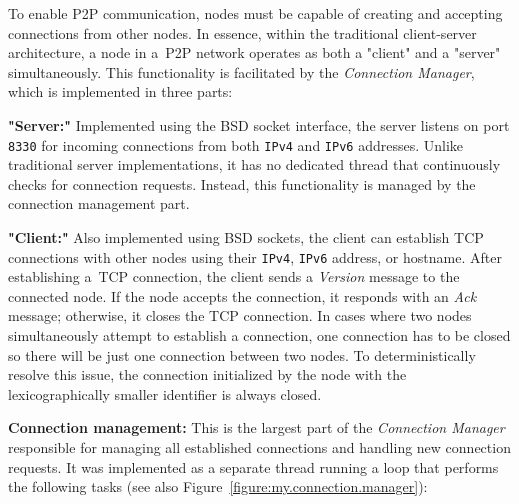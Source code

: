 To enable P2P communication, nodes must be capable of creating and accepting connections from other nodes. In essence, within the traditional client-server architecture, a node in a~P2P network operates as both a "client" and a "server" simultaneously. This functionality is facilitated by the \emph{Connection Manager}, which is implemented in three parts:

\textbf{"Server:"} Implemented using the BSD socket interface, the server listens on port \texttt{8330} for incoming connections from both \texttt{IPv4} and \texttt{IPv6} addresses. Unlike traditional server implementations, it has no dedicated thread that continuously checks for connection requests. Instead, this functionality is managed by the connection management part.

\bigskip

\textbf{"Client:"} Also implemented using BSD sockets, the client can establish TCP connections with other nodes using their \texttt{IPv4}, \texttt{IPv6} address, or hostname. After establishing a~TCP connection, the client sends a \emph{Version} message to the connected node. If the node accepts the connection, it responds with an \emph{Ack} message; otherwise, it closes the TCP connection. In cases where two nodes simultaneously attempt to establish a connection, one connection has to be closed so there will be just one connection between two nodes. To deterministically resolve this issue, the connection initialized by the node with the lexicographically smaller identifier is always closed.

\bigskip

\textbf{Connection management:} This is the largest part of the \emph{Connection Manager} responsible for managing all established connections and handling new connection requests. It was implemented as a separate thread running a loop that performs the following tasks (see also Figure~\ref{figure:my.connection.manager}):

